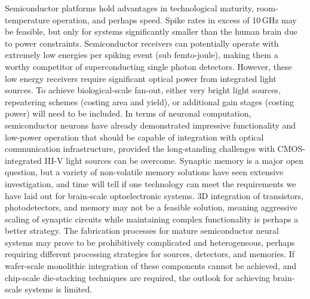\documentclass[twocolumn]{article}
\begin{document}
Semiconductor platforms hold advantages in technological maturity, room-temperature operation, and perhaps speed. Spike rates in excess of 10\,GHz may be feasible, but only for systems significantly smaller than the human brain due to power constraints. Semiconductor receivers can potentially operate with extremely low energies per spiking event (sub femto-joule), making them a worthy competitor of superconducting single photon detectors. However, these low energy receivers require significant optical power from integrated light sources. To achieve biological-scale fan-out, either very bright light sources, repeatering schemes (costing area and yield), or additional gain stages (costing power) will need to be included. In terms of neuronal computation, semiconductor neurons have already demonstrated impressive functionality and low-power operation that should be capable of integration with optical communication infrastructure, provided the long-standing challenges with CMOS-integrated III-V light sources can be overcome. Synaptic memory is a major open question, but a variety of non-volatile memory solutions have seen extensive investigation, and time will tell if one technology can meet the requirements we have laid out for brain-scale optoelectronic systems. 3D integration of transistors, photodetectors, and memory may not be a feasible solution, meaning aggressive scaling of synaptic circuits while maintaining complex functionality is perhaps a better strategy. The fabrication processes for mature semiconductor neural systems may prove to be prohibitively complicated and heterogeneous, perhaps requiring different processing strategies for sources, detectors, and memories. If wafer-scale monolithic integration of these components cannot be achieved, and chip-scale die-stacking techniques are required, the outlook for achieving brain-scale systems is limited.
\end{document}
